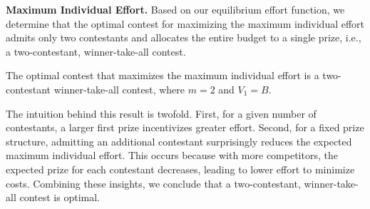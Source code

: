 

\noindent \textbf{Maximum Individual Effort.}
Based on our equilibrium effort function, we determine that the optimal contest for maximizing the maximum individual effort admits only two contestants and allocates the entire budget to a single prize, i.e., a two-contestant, winner-take-all contest.

\begin{theorem}
    The optimal contest that maximizes the maximum individual effort is a two-contestant winner-take-all contest, where $m=2$ and $V_1=B$.
\end{theorem}

The intuition behind this result is twofold. First, for a given number of contestants, a larger first prize incentivizes greater effort. Second, for a fixed prize structure, admitting an additional contestant surprisingly reduces the expected maximum individual effort. This occurs because with more competitors, the expected prize for each contestant decreases, leading to lower effort to minimize costs.
Combining these insights, we conclude that a two-contestant, winner-take-all contest is optimal.

